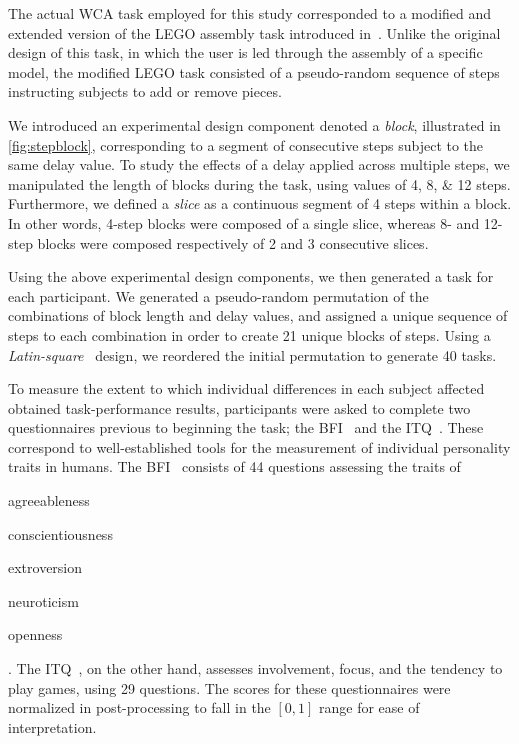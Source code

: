 The actual \gls{WCA} task employed for this study corresponded to a modified and extended version of the LEGO assembly task introduced in~\cite{chen2015early}.
Unlike the original design of this task, in which the user is led through the assembly of a specific model, the modified LEGO task consisted of a pseudo-random sequence of steps instructing subjects to add or remove pieces.

We introduced an experimental design component denoted a \emph{block}, illustrated in \cref{fig:stepblock}, corresponding to a segment of consecutive steps subject to the same delay value.
To study the effects of a delay applied across multiple steps, we manipulated the length of blocks during the task, using values of \numlist[list-final-separator={, or }]{4;8;12} steps.
Furthermore, we defined a \emph{slice} as a continuous segment of \num{4} steps within a block.
In other words, \num{4}-step blocks were composed of a single slice, whereas \num{8}- and \num{12}-step blocks were composed respectively of \num{2} and \num{3} consecutive slices.

Using the above experimental design components, we then generated a task for each participant.
We generated a pseudo-random permutation of the combinations of block length and delay values, and assigned a unique sequence of steps to each combination in order to create \num{21} unique blocks of steps.
Using a \emph{Latin-square}~\cite{keedwell2015latin} design, we reordered the initial permutation to generate \num{40} tasks.

To measure the extent to which individual differences in each subject affected obtained task-performance results, participants were asked to complete two questionnaires previous to beginning the task;
the \gls{BFI}~\cite{john1999big} and the \gls{ITQ}~\cite{witmer1998measuring}.
These correspond to well-established tools for the measurement of individual personality traits in humans.
The \gls{BFI}~\cite{john1999big} consists of \num{44} questions assessing the traits of
\begin{enumerate*}[itemjoin={{, }}, itemjoin*={{, and }}]
    \item agreeableness
    \item conscientiousness
    \item extroversion
    \item neuroticism
    \item openness
\end{enumerate*}.
The \gls{ITQ}~\cite{witmer1998measuring}, on the other hand, assesses involvement, focus, and the tendency to play games, using \num{29} questions.
The scores for these questionnaires were normalized in post-processing to fall in the \ensuremath{[0, 1]} range for ease of interpretation.

